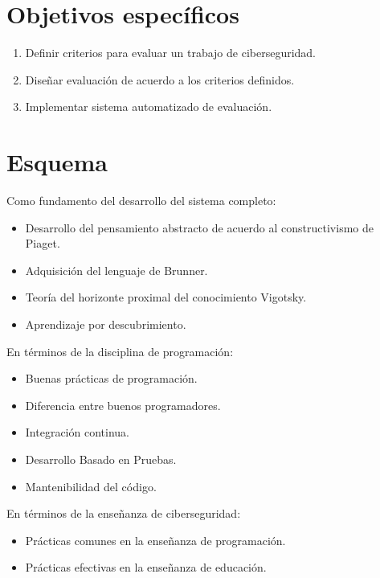 \documentclass[
  12,
]{scrartcl}
\providecommand{\tightlist}{%
  \setlength{\itemsep}{0pt}\setlength{\parskip}{0pt}}
\begin{document}
\hypertarget{objetivos-especuxedficos}{%
\section{Objetivos específicos}\label{objetivos-especuxedficos}}

\begin{enumerate}
\def\labelenumi{\arabic{enumi}.}
\item
  Definir criterios para evaluar un trabajo de ciberseguridad.
\item
  Diseñar evaluación de acuerdo a los criterios definidos.
\item
  Implementar sistema automatizado de evaluación.
\end{enumerate}

\hypertarget{esquema}{%
\section{Esquema}\label{esquema}}

Como fundamento del desarrollo del sistema completo:

\begin{itemize}
\tightlist
\item
  Desarrollo del pensamiento abstracto de acuerdo al constructivismo de
  Piaget.
\item
  Adquisición del lenguaje de Brunner.
\item
  Teoría del horizonte proximal del conocimiento Vigotsky.
\item
  Aprendizaje por descubrimiento.
\end{itemize}

En términos de la disciplina de programación:

\begin{itemize}
\tightlist
\item
  Buenas prácticas de programación.
\item
  Diferencia entre buenos programadores.
\item
  Integración continua.
\item
  Desarrollo Basado en Pruebas.
\item
  Mantenibilidad del código.
\end{itemize}

En términos de la enseñanza de ciberseguridad:

\begin{itemize}
\tightlist
\item
  Prácticas comunes en la enseñanza de programación.
\item
  Prácticas efectivas en la enseñanza de educación.
\end{itemize}
\end{document}
